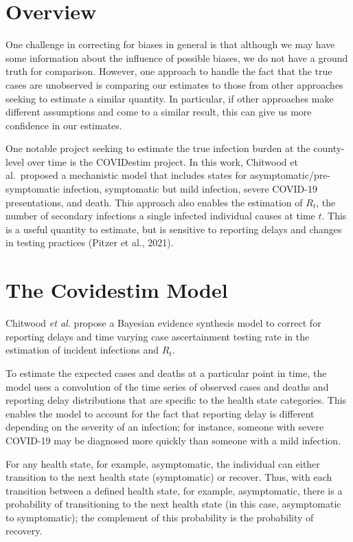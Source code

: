 \documentclass[12pt,twoside]{smiththesis}
\begin{document}
\hypertarget{overview-2}{%
\section{Overview}\label{overview-2}}

One challenge in correcting for biases in general is that although we may have some information about the influence of possible biases, we do not have a ground truth for comparison. However, one approach to handle the fact that the true cases are unobserved is comparing our estimates to those from other approaches seeking to estimate a similar quantity. In particular, if other approaches make different assumptions and come to a similar result, this can give us more confidence in our estimates.

One notable project seeking to estimate the true infection burden at the county-level over time is the COVIDestim project. In this work, Chitwood et al.~proposed a mechanistic model that includes states for asymptomatic/pre-symptomatic infection, symptomatic but mild infection, severe COVID-19 presentations, and death. This approach also enables the estimation of \(R_t\), the number of secondary infections a single infected individual causes at time \(t\). This is a useful quantity to estimate, but is sensitive to reporting delays and changes in testing practices (Pitzer et al., 2021).

\hypertarget{the-covidestim-model}{%
\section{The Covidestim Model}\label{the-covidestim-model}}

Chitwood \emph{et al.} propose a Bayesian evidence synthesis model to correct for reporting delays and time varying case ascertainment testing rate in the estimation of incident infections and \(R_t\).

To estimate the expected cases and deaths at a particular point in time, the model uses a convolution of the time series of observed cases and deaths and reporting delay distributions that are specific to the health state categories. This enables the model to account for the fact that reporting delay is different depending on the severity of an infection; for instance, someone with severe COVID-19 may be diagnosed more quickly than someone with a mild infection.

For any health state, for example, asymptomatic, the individual can either transition to the next health state (symptomatic) or recover. Thus, with each transition between a defined health state, for example, asymptomatic, there is a probability of transitioning to the next health state (in this case, asymptomatic to symptomatic); the complement of this probability is the probability of recovery.
\end{document}
